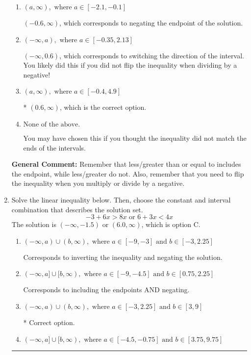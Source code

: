 \documentclass{extbook}[14pt]
\newcommand{\litem}[1]{\item #1

\rule{\textwidth}{0.4pt}}
\begin{document}
\begin{enumerate}
{\begin{enumerate}[label=\Alph*.]
 $(-\infty, -0.6)$, which corresponds to switching the direction of the interval AND negating the endpoint. You likely did this if you did not flip the inequality when dividing by a negative as well as not moving values over to a side properly.
\item \( (a, \infty), \text{ where } a \in [-2.1, -0.1] \)

 $(-0.6, \infty)$, which corresponds to negating the endpoint of the solution.
\item \( (-\infty, a), \text{ where } a \in [-0.35, 2.13] \)

 $(-\infty, 0.6)$, which corresponds to switching the direction of the interval. You likely did this if you did not flip the inequality when dividing by a negative!
\item \( (a, \infty), \text{ where } a \in [-0.4, 4.9] \)

* $(0.6, \infty)$, which is the correct option.
\item \( \text{None of the above}. \)

You may have chosen this if you thought the inequality did not match the ends of the intervals.
\end{enumerate}

\textbf{General Comment:} Remember that less/greater than or equal to includes the endpoint, while less/greater do not. Also, remember that you need to flip the inequality when you multiply or divide by a negative.
}
\litem{
Solve the linear inequality below. Then, choose the constant and interval combination that describes the solution set.
\[ -3 + 6 x > 8 x \text{ or } 6 + 3 x < 4 x \]The solution is \( (-\infty, -1.5) \text{ or } (6.0, \infty) \), which is option C.\begin{enumerate}[label=\Alph*.]
\item \( (-\infty, a) \cup (b, \infty), \text{ where } a \in [-9, -3] \text{ and } b \in [-3, 2.25] \)

Corresponds to inverting the inequality and negating the solution.
\item \( (-\infty, a] \cup [b, \infty), \text{ where } a \in [-9, -4.5] \text{ and } b \in [0.75, 2.25] \)

Corresponds to including the endpoints AND negating.
\item \( (-\infty, a) \cup (b, \infty), \text{ where } a \in [-3, 2.25] \text{ and } b \in [3, 9] \)

 * Correct option.
\item \( (-\infty, a] \cup [b, \infty), \text{ where } a \in [-4.5, -0.75] \text{ and } b \in [3.75, 9.75] \)


\end{enumerate}}
\end{enumerate}
\end{document}
